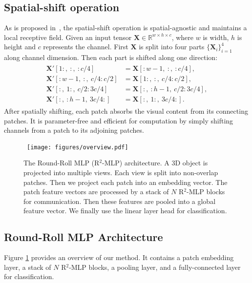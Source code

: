 \documentclass[11pt]{article}
\begin{document}
\subsection{Spatial-shift operation}

As is proposed in~\citet{yu2022s2mlp}, the spatial-shift operation is spatial-agnostic and maintains a local receptive field.
Given an input tensor $\bm{X} \in \mathbb{R}^{w \times h \times c}$, where $w$ is width, $h$ is height and $c$ represents the channel. First $\bm{X}$ is split into four parts $\{\bm{X}_i\}_{i=1}^4$ along channel dimension. Then each part is shifted along one direction:
\begin{align}
\begin{split}
     \bm{X'}[1\!: ,\ : ,\ :\!c/4] &= \bm{X}[:\!w\!-\!1 ,\ : ,\ :\!c/4], \\
     \bm{X'}[:\!w\!-\!1 ,\ : ,\ c/4\!:\!c/2] &= \bm{X}[1\!: ,\ : ,\ c/4\!:\!c/2], \\
     \bm{X'}[: ,\ 1\!: ,\ c/2\!:\!3c/4] &= \bm{X}[: ,\ :\!h\!-\!1 ,\ c/2\!:\!3c/4], \\
     \bm{X'}[: ,\ :\!h\!-\!1 ,\ 3c/4\!:] &= \bm{X}[: ,\ 1\!: ,\ 3c/4\!:].
\end{split}
\end{align}
After spatially shifting, each patch absorbs the visual content from its connecting patches. It is parameter-free and efficient for computation by simply shifting channels from a patch to its adjoining patches.


\begin{figure}[ht]

\centering
\mbox{
     \texttt{[image: figures/overview.pdf]}
}

\vspace{0.2in}

     \caption{
    The Round-Roll MLP (R$^2$-MLP) architecture. A 3D object is projected into multiple views. Each view is split into non-overlap patches. Then we project each patch into an embedding vector. The patch feature vectors are processed by a stack of $N$ R$^2$-MLP blocks for communication. Then these features are pooled into a global feature vector. We finally use the linear layer head for classification.}
     \label{fig:overview}
 \end{figure}

\subsection{Round-Roll MLP Architecture}
Figure \ref{fig:overview}  provides an overview of our method. It contains a patch embedding layer, a stack of $N$ R$^2$-MLP blocks, a pooling layer, and a fully-connected layer for classification.
\end{document}
